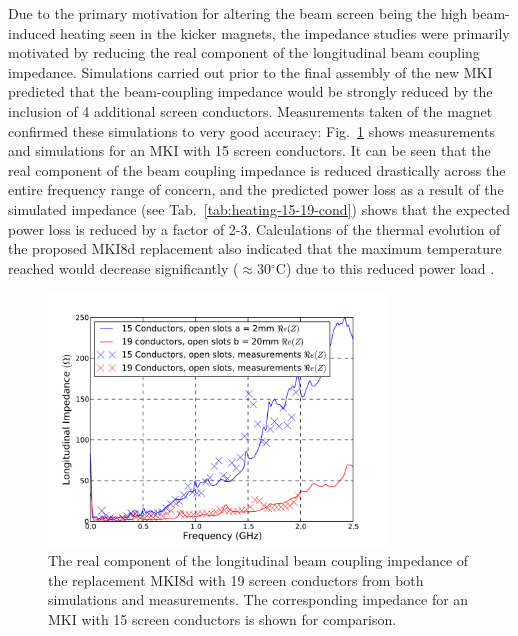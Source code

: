 Due to the primary motivation for altering the beam screen being the high beam-induced heating seen in the kicker magnets, the impedance studies were primarily motivated by reducing the real component of the longitudinal beam coupling impedance. Simulations carried out prior to the final assembly of the new MKI predicted that the beam-coupling impedance would be strongly reduced by the inclusion of 4 additional screen conductors. Measurements taken of the magnet  confirmed these simulations to very good accuracy: Fig.~\ref{fig:mki-19-impedance} shows measurements and simulations for an MKI with 15 screen conductors. It can be seen that the real component of the beam coupling impedance is reduced drastically across the entire frequency range of concern, and the predicted power loss as a result of the simulated impedance (see Tab.~\ref{tab:heating-15-19-cond}) shows that the expected power loss is reduced by a factor of 2-3. Calculations of the thermal evolution of the proposed MKI8d replacement also indicated that the maximum temperature reached would decrease significantly ($\approx$30$^{\circ}$C) due to this reduced power load \cite{Garlasche:2dHeatEmis}. 

\begin{figure}
\begin{center}
\includegraphics[width=0.8\textwidth]{LHC_MKI/figures/15_19_sims_measured_comparison.pdf}
\end{center}
\caption{The real component of the longitudinal beam coupling impedance of the replacement MKI8d with 19 screen conductors from both simulations and measurements. The corresponding impedance for an MKI with 15 screen conductors is shown for comparison.}
\label{fig:mki-19-impedance}
\end{figure}

